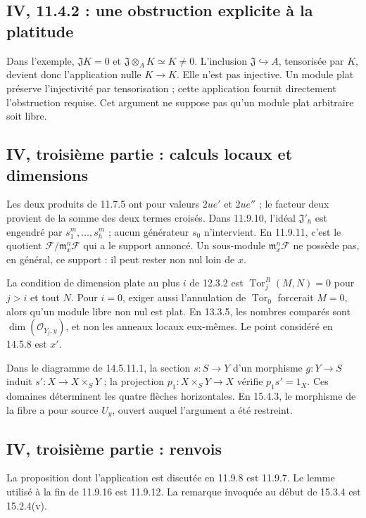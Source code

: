 \documentclass[11pt,a4paper]{article}
\begin{document}
\subsection{IV, 11.4.2 : une obstruction explicite à la platitude}
\label{note:iv3-nonflat}
Dans l'exemple, $\mathfrak J K=0$ et
$\mathfrak J\otimes_A K\simeq K\ne0$.
L'inclusion $\mathfrak J\hookrightarrow A$, tensorisée par $K$, devient
donc l'application nulle $K\to K$. Elle n'est pas injective.
Un module plat préserve l'injectivité par tensorisation ; cette
application fournit directement l'obstruction requise.
Cet argument ne suppose pas qu'un module plat arbitraire soit libre.

\subsection{IV, troisième partie : calculs locaux et dimensions}
\label{note:iv3-modules}
Les deux produits de 11.7.5 ont pour valeurs $2ue'$ et $2ue''$ ; le
facteur deux provient de la somme des deux termes croisés.
Dans 11.9.10, l'idéal $\mathfrak J'_h$ est engendré par
$s_1^m,\ldots,s_h^m$ ; aucun générateur $s_0$ n'intervient.
En 11.9.11, c'est le quotient
$\mathcal F/\mathfrak m_x^n\mathcal F$ qui a le support annoncé.
Un sous-module $\mathfrak m_x^n\mathcal F$ ne possède pas, en général,
ce support : il peut rester non nul loin de $x$.

La condition de dimension plate au plus $i$ de 12.3.2 est
$\operatorname{Tor}^B_j(M,N)=0$ pour $j>i$ et tout $N$.
Pour $i=0$, exiger aussi l'annulation de $\operatorname{Tor}_0$
forcerait $M=0$, alors qu'un module libre non nul est plat.
En 13.3.5, les nombres comparés sont
$\dim(\mathcal O_{Y_j,y})$, et non les anneaux locaux eux-mêmes.
Le point considéré en 14.5.8 est $x'$.

Dans le diagramme de 14.5.11.1, la section $s:S\to Y$ d'un
morphisme $g:Y\to S$ induit $s':X\to X\times_S Y$ ; la projection
$p_1:X\times_S Y\to X$ vérifie $p_1s'=1_X$.
Ces domaines déterminent les quatre flèches horizontales.
En 15.4.3, le morphisme de la fibre a pour source $U_y$,
ouvert auquel l'argument a été restreint.

\subsection{IV, troisième partie : renvois}
\label{note:iv3-refs}
La proposition dont l'application est discutée en 11.9.8 est 11.9.7.
Le lemme utilisé à la fin de 11.9.16 est 11.9.12.
La remarque invoquée au début de 15.3.4 est 15.2.4(v).
\par
\end{document}

